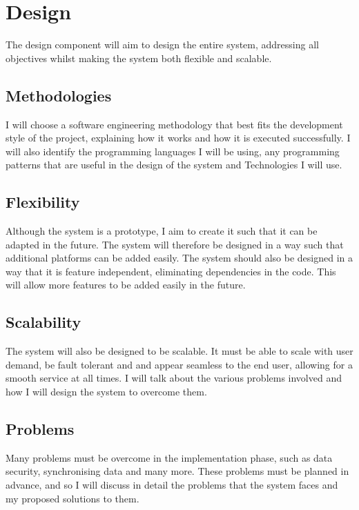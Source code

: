 
\section{Design}

The design component will aim to design the entire system, addressing all objectives whilst making the system both flexible and scalable.

\subsection{Methodologies}

I will choose a software engineering methodology that best fits the development style of the project, explaining how it works and how it is executed successfully. I will also identify the programming languages I will be using, any programming patterns that are useful in the design of the system and Technologies I will use.

\subsection{Flexibility}

Although the system is a prototype, I aim to create it such that it can be adapted in the future. The system will therefore be designed in a way such that additional platforms can be added easily. The system should also be designed in a way that it is feature independent, eliminating dependencies in the code. This will allow more features to be added easily in the future.

\subsection{Scalability}

The system will also be designed to be scalable. It must be able to scale with user demand, be fault tolerant and and appear seamless to the end user, allowing for a smooth service at all times. I will talk about the various problems involved and how I will design the system to overcome them.

\subsection{Problems}

Many problems must be overcome in the implementation phase, such as data security, synchronising data and many more. These problems must be planned in advance, and so I will discuss in detail the problems that the system faces and my proposed solutions to them.

